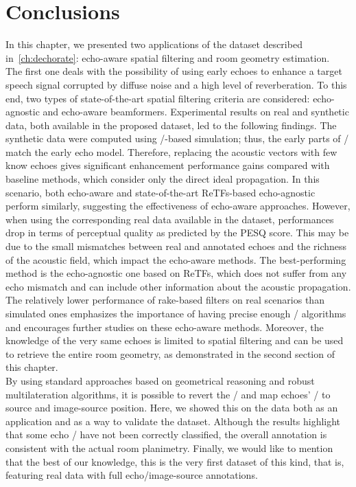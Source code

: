 \section{Conclusions}\label{sec:dechorateapp:conclusion}
In this chapter, we presented two applications of the \dEchorate{} dataset described in~\cref{ch:dechorate}: echo-aware spatial filtering and room geometry estimation.
\\The first one deals with the possibility of using early echoes to enhance a target speech signal corrupted by diffuse noise and a high level of reverberation.
To this end, two types of state-of-the-art spatial filtering criteria are considered: echo-agnostic and echo-aware beamformers.
Experimental results on real and synthetic data, both available in the proposed dataset, led to the following findings.
The synthetic data were computed using \ISM/-based simulation; thus, the early parts of \RIRs/ match the early echo model.
Therefore, replacing the acoustic vectors with few know echoes gives significant enhancement performance gains compared with baseline methods, which consider only the direct ideal propagation.
In this scenario, both echo-aware and state-of-the-art \acp{ReTF}-based echo-agnostic perform similarly, suggesting the effectiveness of echo-aware approaches.
However, when using the corresponding real data available in the dataset, performances drop in terms of perceptual quality as predicted by the \acs{PESQ} score.
This may be due to the small mismatches between real and annotated echoes and the richness of the acoustic field, which impact the echo-aware methods.
The best-performing method is the echo-agnostic one based on \acp{ReTF}, which does not suffer from any echo mismatch and can include other information about the acoustic propagation.
\\The relatively lower performance of rake-based filters on real scenarios than simulated ones emphasizes the importance of having precise enough \AER/ algorithms and encourages further studies on these echo-aware methods.
Moreover, the knowledge of the very same echoes is limited to spatial filtering and can be used to retrieve the entire room geometry, as demonstrated in the second section of this chapter.
\\By using standard approaches based on geometrical reasoning and robust multilateration algorithms, it is possible to revert the \ISM/ and map echoes' \TOAs/ to source and image-source position.
Here, we showed this on the \dEchorate data both as an application and as a way to validate the dataset.
Although the results highlight that some echo \TOAs/ have not been correctly classified, the overall annotation is consistent with the actual room planimetry.
Finally, we would like to mention that the best of our knowledge, this is the very first dataset of this kind, that is, featuring real data with full echo/image-source annotations.

